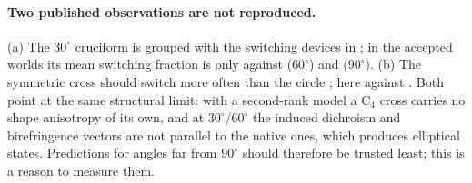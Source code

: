\documentclass[10pt]{article}
\begin{document}
\paragraph{Two published observations are not reproduced.} (a) The $30^\circ$ cruciform is grouped with the switching devices in \cite{yuan2025apl126}; in the accepted worlds its mean switching fraction is only \pswThirty{} against \pswSixty{} ($60^\circ$) and \pswNinety{} ($90^\circ$).
(b) The symmetric cross should switch more often than the circle \cite{yuan2025clea}; here \pswSym{} against \pswCircle. Both point at the same structural limit: with a second-rank model a C$_4$ cross carries no shape anisotropy of its own, and at $30^\circ$/$60^\circ$ the
induced dichroism and birefringence vectors are not parallel to the native ones, which produces elliptical states. Predictions for angles far from $90^\circ$ should therefore be trusted least; this is a reason to measure them.


\end{document}
